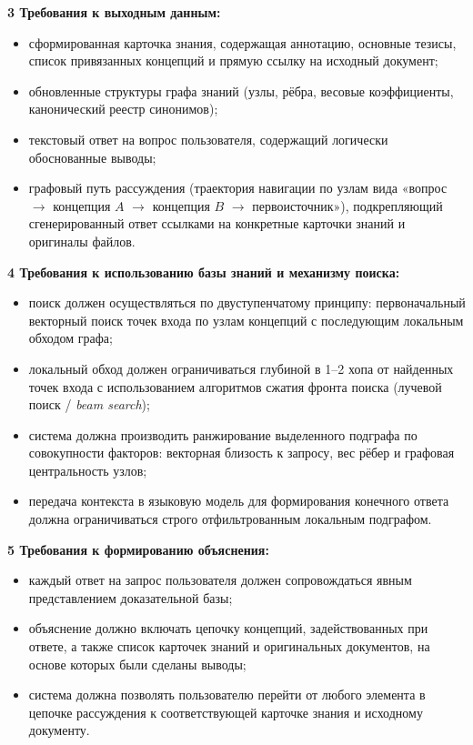     \textbf{3 Требования к выходным данным:}
    \begin{itemize}
        \item сформированная карточка знания, содержащая аннотацию, основные тезисы, список привязанных концепций и прямую ссылку на исходный документ;
        \item обновленные структуры графа знаний (узлы, рёбра, весовые коэффициенты, канонический реестр синонимов);
        \item текстовый ответ на вопрос пользователя, содержащий логически обоснованные выводы;
        \item графовый путь рассуждения (траектория навигации по узлам вида «вопрос $\rightarrow$ концепция $A$ $\rightarrow$ концепция $B$ $\rightarrow$ первоисточник»), подкрепляющий сгенерированный ответ ссылками на конкретные карточки знаний и оригиналы файлов.
    \end{itemize}

    \textbf{4 Требования к использованию базы знаний и механизму поиска:}
    \begin{itemize}
        \item поиск должен осуществляться по двуступенчатому принципу: первоначальный векторный поиск точек входа по узлам концепций с последующим локальным обходом графа;
        \item локальный обход должен ограничиваться глубиной в 1--2 хопа от найденных точек входа с использованием алгоритмов сжатия фронта поиска (лучевой поиск / \textit{beam search});
        \item система должна производить ранжирование выделенного подграфа по совокупности факторов: векторная близость к запросу, вес рёбер и графовая центральность узлов;
        \item передача контекста в языковую модель для формирования конечного ответа должна ограничиваться строго отфильтрованным локальным подграфом.
    \end{itemize}

    \textbf{5 Требования к формированию объяснения:}
    \begin{itemize}
        \item каждый ответ на запрос пользователя должен сопровождаться явным представлением доказательной базы;
        \item объяснение должно включать цепочку концепций, задействованных при ответе, а также список карточек знаний и оригинальных документов, на основе которых были сделаны выводы;
        \item система должна позволять пользователю перейти от любого элемента в цепочке рассуждения к соответствующей карточке знания и исходному документу.
    \end{itemize}


